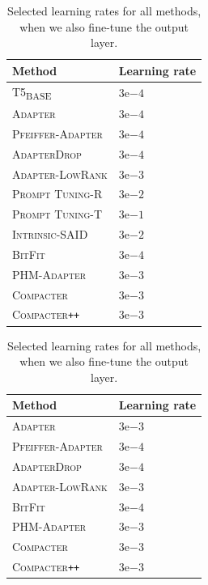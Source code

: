 \documentclass{article}
\newcommand{\basebase}{T5\textsubscript{\tiny BASE}\xspace}
\newcommand{\adapter}{\textsc{Adapter}\xspace}
\newcommand{\adapterlowrank}{\textsc{Adapter-LowRank}\xspace}
\newcommand{\adapternoclf}{\textsc{Adapter}\xspace}
\newcommand{\compacter}{\textsc{Compacter}\xspace}
\newcommand{\compacteronlyff}{\textsc{Compacter}\texttt{++}\xspace} %
\newcommand{\compacternoclf}{\textsc{Compacter}\xspace}
\newcommand{\compacteronlyffnoclf}{\textsc{Compacter}\texttt{++}\xspace} %
\newcommand{\phmadapter}{\textsc{PHM-Adapter}\xspace}
\newcommand{\phmadapternoclf}{\textsc{PHM-Adapter}\xspace}
\newcommand{\intrinsic}{\textsc{Intrinsic-SAID}\xspace}
\newcommand{\prompttuningrandom}{\textsc{Prompt Tuning-R}\xspace}
\newcommand{\prompttuningtokens}{\textsc{Prompt Tuning-T}\xspace}
\newcommand{\pfeifferadapter}{\textsc{Pfeiffer-Adapter}\xspace}
\newcommand{\pfeifferadapternoclf}{\textsc{Pfeiffer-Adapter}\xspace}
\newcommand{\adapterdrop}{\textsc{AdapterDrop}\xspace}
\newcommand{\adapterdropnoclf}{\textsc{AdapterDrop}\xspace}
\newcommand{\bitfit}{\textsc{BitFit}\xspace}
\newcommand{\bitfitnoclf}{\textsc{BitFit}\xspace}
\begin{document}
\begin{table}[tp]
    \begin{minipage}{.5\linewidth}
    \caption{Selected learning rates for all methods.}
    \centering
    \begin{tabular}{ll}
    \toprule
    \textbf{Method} & \textbf{Learning rate}   \\
    \midrule  
     \basebase    &  $3\mathrm{e}{-4}$ \\ 
     \adapternoclf & $3\mathrm{e}{-4}$ \\
     \pfeifferadapternoclf & $3\mathrm{e}{-4}$ \\
     \adapterdropnoclf & $3\mathrm{e}{-4}$\\ 
     \adapterlowrank & $3\mathrm{e}{-3}$\\
     \prompttuningrandom &  $3\mathrm{e}{-2}$ \\
     \prompttuningtokens & $3\mathrm{e}{-1}$\\
     \intrinsic & $3\mathrm{e}{-2}$\\ 
     \bitfitnoclf & $3\mathrm{e}{-4}$ \\ 
     \phmadapternoclf &  $3\mathrm{e}{-3}$ \\ 
     \compacternoclf &  $3\mathrm{e}{-3}$\\ 
     \compacteronlyffnoclf &  $3\mathrm{e}{-3}$\\
    \bottomrule
    \end{tabular}
     \label{tab:lrs}
    \end{minipage}\quad
    \begin{minipage}{.5\linewidth}
    \vspace{-3.2em}
      \centering
       \caption{Selected learning rates for all methods, when we also fine-tune the output layer.}
       \begin{tabular}{ll}
    \toprule
    \textbf{Method} & \textbf{Learning rate}   \\
    \midrule  
    \adapter   & $3\mathrm{e}{-3}$ \\ 
    \pfeifferadapter & $3\mathrm{e}{-4}$\\
    \adapterdrop &  $3\mathrm{e}{-4}$\\ 
    \adapterlowrank & $3\mathrm{e}{-3}$\\ 
    \bitfit &$3\mathrm{e}{-4}$ \\ 
    \phmadapter &  $3\mathrm{e}{-3}$ \\ 
    \compacter & $3\mathrm{e}{-3}$ \\ 
    \compacteronlyff & $3\mathrm{e}{-3}$ \\ 
    \bottomrule
    \end{tabular}
     \label{tab:lrs_with_lm_head}
    \end{minipage} 
\end{table}
\end{document}
